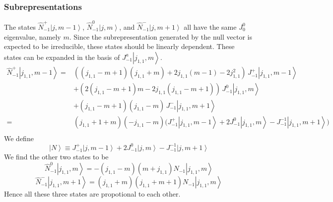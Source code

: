 \documentclass[10pt,a4paper]{article}
\numberwithin{equation}{section}
\newcommand{\ket}[1]{\left| #1 \right\rangle}
\begin{document}
\subsubsection*{Subrepresentations}

The states $\hat{N}^{+}_{-1}\ket{j,m-1}$, $\hat{N}^{0}_{-1}\ket{j,m}$, and $\hat{N}^{-}_{-1} \ket{j,m+1}$ 
all have the same $J^{0}_{0}$ eigenvalue, namely $m$. Since the subrepresentation generated by the null vector is 
expected to be irreducible, these states should be linearly dependent. These states can be expanded in the basis of 
$J^{a}_{-1}\ket{j_{1,1},m}$. 
\begin{equation}
    \begin{aligned}
        \hat{N}^{+}_{-1} \ket{j_{1,1},m-1} = & ((j_{1,1}-m+1)(j_{1,1}+m) +2 j_{1,1}(m-1) -2 j_{1,1}^2) \, J^{+}_{-1}  \ket{j_{1,1},m-1} \\
        & + (2(j_{1,1}-m+1)m-2j_{1,1}(j_{1,1}-m+1)) \, J^{0}_{-1}  \ket{j_{1,1},m} \\
        & + (j_{1,1}-m+1)(j_{1,1}-m) \, J^{-}_{-1} \ket{j_{1,1},m+1}\\
        = & (j_{1,1}+1+m)(-j_{1,1}-m)\Big( J^{+}_{-1} \ket{j_{1,1},m-1} + 2 J^{0}_{-1} \ket{j_{1,1},m} - J^{-1}_{-1} \ket{j_{1,1},m+1} \Big)\\
    \end{aligned}
\end{equation}
We define 
\begin{equation}
    \ket{N} \equiv J^{+}_{-1} \ket{j,m-1} + 2 J^{0}_{-1} \ket{j,m} - J^{-1}_{-1} \ket{j,m+1}
\end{equation}
We find the other two states to be
\begin{equation}
    \hat{N}^{0}_{-1} \ket{j_{1,1},m} = -(j_{1,1}-m)(m+j_{1,1}) N_{-1} \ket{j_{1,1},m}
\end{equation}
\begin{equation}
    \hat{N}^{-}_{-1} \ket{j_{1,1},m+1} =  (j_{1,1}+m)(j_{1,1}+m+1) N_{-1} \ket{j_{1,1},m}
\end{equation}
Hence all these three states are propotional to each other. 
\end{document}

